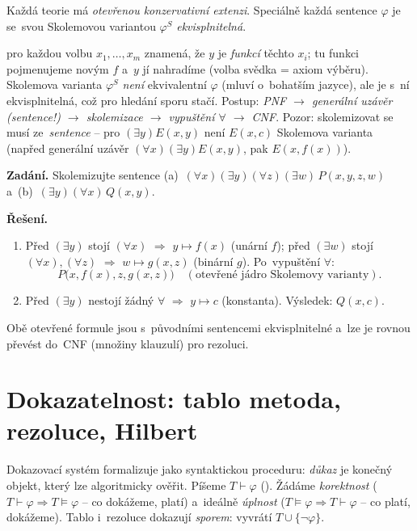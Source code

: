 \documentclass[11pt,a4paper]{article}
\begin{document}
\begin{veta}
Každá teorie má \emph{otevřenou konzervativní extenzi}. Speciálně každá sentence $\varphi$ je se~svou Skolemovou variantou $\varphi^S$ \emph{ekvisplnitelná}.
\end{veta}

\begin{intuice}
 pro každou volbu $x_1,\dots,x_m$ znamená, že $y$ je \emph{funkcí} těchto $x_i$; tu funkci pojmenujeme novým $f$ a~$y$ jí nahradíme (volba svědka = axiom výběru). Skolemova varianta $\varphi^S$ \emph{není} ekvivalentní $\varphi$ (mluví o~bohatším jazyce), ale je s~ní ekvisplnitelná, což pro hledání sporu stačí. Postup: \emph{PNF $\to$ generální uzávěr (sentence!) $\to$ skolemizace $\to$ vypuštění $\forall$ $\to$ CNF}. Pozor: skolemizovat se musí ze~\emph{sentence} -- pro $(\exists y)E(x,y)$ není $E(x,c)$ Skolemova varianta (napřed generální uzávěr $(\forall x)(\exists y)E(x,y)$, pak $E(x,f(x))$).
\end{intuice}

\begin{priklad}[Skolemizace]
\textbf{Zadání.} Skolemizujte sentence (a)~$(\forall x)(\exists y)(\forall z)(\exists w)\,P(x,y,z,w)$ a~(b)~$(\exists y)(\forall x)\,Q(x,y)$.

\smallskip
\textbf{Řešení.}
\begin{enumerate}[label=(\alph*)]
  \item Před $(\exists y)$ stojí $(\forall x)$ $\Rightarrow$ $y\mapsto f(x)$ (unární $f$); před $(\exists w)$ stojí $(\forall x),(\forall z)$ $\Rightarrow$ $w\mapsto g(x,z)$ (binární $g$). Po~vypuštění $\forall$:
    \[
    \boxed{P\big(x,f(x),z,g(x,z)\big)}\quad(\text{otevřené jádro Skolemovy varianty}).
    \]
  \item Před $(\exists y)$ nestojí žádný $\forall$ $\Rightarrow$ $y\mapsto c$ (konstanta). Výsledek: $\boxed{Q(x,c)}$.
\end{enumerate}
Obě otevřené formule jsou s~původními sentencemi ekvisplnitelné a~lze je rovnou převést do~CNF (množiny klauzulí) pro rezoluci.
\end{priklad}

\section{Dokazatelnost: tablo metoda, rezoluce, Hilbert}\label{sec:dokaz}

Dokazovací systém formalizuje  jako syntaktickou proceduru: \emph{důkaz} je konečný objekt, který lze algoritmicky ověřit. Píšeme $T\vdash\varphi$ (). Žádáme \emph{korektnost} ($T\vdash\varphi\Rightarrow T\models\varphi$ -- co dokážeme, platí) a~ideálně \emph{úplnost} ($T\models\varphi\Rightarrow T\vdash\varphi$ -- co platí, dokážeme). Tablo i~rezoluce dokazují \emph{sporem}: vyvrátí $T\cup\{\neg\varphi\}$.
\end{document}
